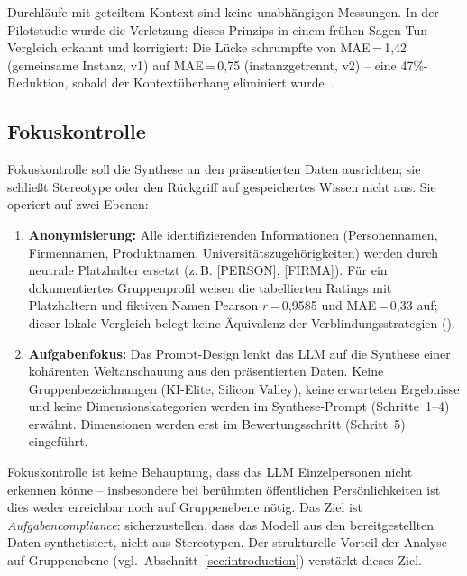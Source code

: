 \documentclass[11pt,a4paper]{article}
\begin{document}
Durchläufe mit geteiltem Kontext sind keine unabhängigen Messungen. In der Pilotstudie wurde die Verletzung dieses Prinzips in einem frühen Sagen-Tun-Vergleich erkannt und korrigiert: Die Lücke schrumpfte von MAE\,=\,1,42 (gemeinsame Instanz, v1) auf MAE\,=\,0,75 (instanzgetrennt, v2) -- eine 47\%-Reduktion, sobald der Kontextüberhang eliminiert wurde~\citep{Geiger2026PaperA}.


\subsection{Fokuskontrolle}
\label{sec:method:focus}

Fokuskontrolle soll die Synthese an den präsentierten Daten ausrichten; sie schließt Stereotype oder den Rückgriff auf gespeichertes Wissen nicht aus. Sie operiert auf zwei Ebenen:

\begin{enumerate}[nosep]
  \item \textbf{Anonymisierung:} Alle identifizierenden Informationen (Personennamen, Firmennamen, Produktnamen, Universitätszugehörigkeiten) werden durch neutrale Platzhalter ersetzt (z.\,B. [PERSON], [FIRMA]). Für ein dokumentiertes Gruppenprofil weisen die tabellierten Ratings mit Platzhaltern und fiktiven Namen Pearson $r$\,=\,0,9585 und MAE\,=\,0,33 auf; dieser lokale Vergleich belegt keine Äquivalenz der Verblindungsstrategien (\citealp{Geiger2026PaperA}).
  \item \textbf{Aufgabenfokus:} Das Prompt-Design lenkt das LLM auf die Synthese einer kohärenten Weltanschauung aus den präsentierten Daten. Keine Gruppenbezeichnungen (\glqq{}KI-Elite\grqq{}, \glqq{}Silicon Valley\grqq{}), keine erwarteten Ergebnisse und keine Dimensionskategorien werden im Synthese-Prompt (Schritte~1--4) erwähnt. Dimensionen werden erst im Bewertungsschritt (Schritt~5) eingeführt.
\end{enumerate}

Fokuskontrolle ist keine Behauptung, dass das LLM Einzelpersonen nicht erkennen könne -- insbesondere bei berühmten öffentlichen Persönlichkeiten ist dies weder erreichbar noch auf Gruppenebene nötig. Das Ziel ist \emph{Aufgabencompliance}: sicherzustellen, dass das Modell aus den bereitgestellten Daten synthetisiert, nicht aus Stereotypen. Der strukturelle Vorteil der Analyse auf Gruppenebene (vgl.\ Abschnitt~\ref{sec:introduction}) verstärkt dieses Ziel.


\end{document}
